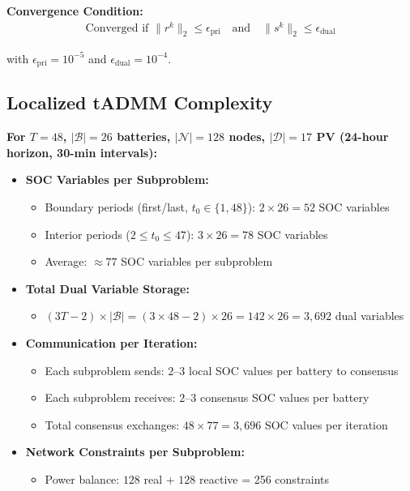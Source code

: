 \documentclass[11pt]{article}
\begin{document}
\textbf{Convergence Condition:}
\begin{align}
\text{Converged if } \|r^k\|_2 \leq \epsilon_{\text{pri}} \quad \text{and} \quad \|s^k\|_2 \leq \epsilon_{\text{dual}}
\end{align}

with $\epsilon_{\text{pri}} = 10^{-5}$ and $\epsilon_{\text{dual}} = 10^{-4}$.

\subsection{Localized tADMM Complexity}

\textbf{For $T=48$, $|\mathcal{B}|=26$ batteries, $|\mathcal{N}|=128$ nodes, $|\mathcal{D}|=17$ PV (24-hour horizon, 30-min intervals):}
\begin{itemize}
    \item \textbf{SOC Variables per Subproblem:}
    \begin{itemize}
        \item Boundary periods (first/last, $t_0 \in \{1, 48\}$): $2 \times 26 = 52$ SOC variables
        \item Interior periods ($2 \leq t_0 \leq 47$): $3 \times 26 = 78$ SOC variables
        \item Average: $\approx 77$ SOC variables per subproblem
    \end{itemize}
    \item \textbf{Total Dual Variable Storage:}
    \begin{itemize}
        \item $(3T - 2) \times |\mathcal{B}| = (3 \times 48 - 2) \times 26 = 142 \times 26 = 3,692$ dual variables
    \end{itemize}
    \item \textbf{Communication per Iteration:}
    \begin{itemize}
        \item Each subproblem sends: $2$--$3$ local SOC values per battery to consensus
        \item Each subproblem receives: $2$--$3$ consensus SOC values per battery
        \item Total consensus exchanges: $48 \times 77 = 3,696$ SOC values per iteration
    \end{itemize}
    \item \textbf{Network Constraints per Subproblem:}
    \begin{itemize}
        \item Power balance: $128$ real + $128$ reactive = 256 constraints

\end{itemize}
\end{itemize}
\end{document}

